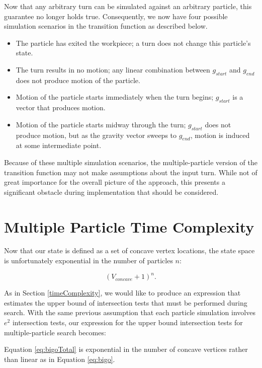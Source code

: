 Now that any arbitrary turn can be simulated against an arbitrary particle, this guarantee no longer holds true. Consequently, we now have four possible simulation scenarios in the transition function as described below.


\begin{itemize}
\item The particle has exited the workpiece; a turn does not change this particle's state.
\item The turn results in no motion; any linear combination between $g_{start}$ and $g_{end}$ does not produce motion of the particle.
\item Motion of the particle starts immediately when the turn begins; $g_{start}$ is a vector that produces motion.
\item Motion of the particle starts midway through the turn; $g_{start}$ does not produce motion, but as the gravity vector sweeps to $g_{end}$, motion is induced at some intermediate point.
\end{itemize}

Because of these multiple simulation scenarios, the multiple-particle version of the transition function may not make assumptions about the input turn. While not of great importance for the overall picture of the approach, this presents a significant obstacle during implementation that should be considered.

\section{Multiple Particle Time Complexity}

Now that our state is defined as a set of concave vertex locations, the state space is unfortunately exponential in the number of particles $n$:

$$
(V_{concave} + 1)^n.
$$

As in Section \ref{timeComplexity}, we would like to produce an expression that estimates the upper bound of intersection tests that must be performed during search. With the same previous assumption that each particle simulation involves $e^2$ intersection tests, our expression for the upper bound intersection tests for multiple-particle search becomes:

 {
  \label{eq:bigoTotal}
}

Equation \eqref{eq:bigoTotal} is exponential in the number of concave vertices rather than linear as in Equation \eqref{eq:bigo}.

